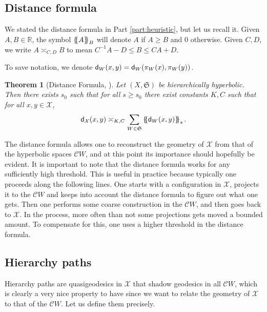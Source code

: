 \documentclass[11pt,oneside]{amsart}
\newtheorem{thm}{Theorem}[section]
\theoremstyle{definition}
\newcommand{\field}[1]{\mathbb{#1}}
\newcommand{\reals}{\ensuremath{\field{R}}}
\newcommand{\tsh}[1]{\left\{\kern-.7ex\left\{#1\right\}\kern-.7ex\right\}}
\newcommand{\Tsh}[2]{\tsh{#2}_{#1}}
\newcommand{\ignore}[2]{\Tsh{#2}{#1}}
\newcommand{\co}{\colon}
\newcommand{\dist}{\textup{\textsf{d}}}
\newcommand{\cuco}[1]{{\mathcal #1}}
\newcommand{\fontact}{{\mathcal C}}
\begin{document}
\subsection{Distance formula}

We stated the distance formula in Part \ref{part:heuristic}, but let us recall it. Given $A,B\in\reals$, the symbol $\ignore{A}{B}$ will denote $A$ if $A\geq B$ and $0$ otherwise.  Given $C,D$, we write $A\asymp_{C,D}B$ to mean $C^{-1}A-D\leq B\leq CA+D$.

To save notation, we denote $\dist_{ W}(x,y)=\dist_{ W}(\pi_W(x),\pi_W(y))$.


\begin{thm}[{Distance Formula, \cite[Theorem 4.5]{HHS2}}]\label{thm:distance_formula}
 Let $(X,\mathfrak S)$ be hierarchically hyperbolic. Then there exists $s_0$ such that for all $s\geq s_0$ there exist
 constants $K,C$ such that for all $x,y\in\cuco X$,
 $$\dist_{\cuco X}(x,y)\asymp_{K,C}\sum_{W\in\mathfrak S}\ignore{\dist_{ W}(x,y)}{s}.$$
\end{thm}

The distance formula allows one to reconstruct the geometry of $\cuco X$ from that of the hyperbolic spaces $\fontact W$, and at this point its importance should hopefully be evident. It is important to note that the distance formula works for any sufficiently high threshold. This is useful in practice because typically one proceeds along the following lines. One starts with a configuration in $\cuco X$, projects it to the $\fontact W$ and keeps into account the distance formula to figure out what one gets. Then one performs some coarse construction in the $\fontact W$, and then goes back to $\cuco X$. In the process, more often than not some projections gets moved a bounded amount. To compensate for this, one uses a higher threshold in the distance formula.


\subsection{Hierarchy paths}


Hierarchy paths are quasigeodesics in $\cuco X$ that shadow geodesics in all $\fontact W$, which is clearly a very nice property to have since we want to relate the geometry of $\cuco X$ to that of the $\fontact W$. Let us define them precisely.
\end{document}
